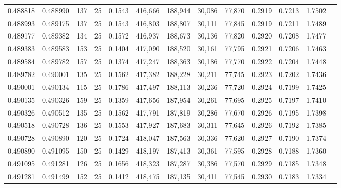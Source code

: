 \begin{tabular}{rrrrrrrrrrrrr}
0.488818 & 0.488990 &   137 &  25 &                                     0.1543 & 416,666 & 188,944 &  30,086 &  77,870 & 0.2919 & 0.7213 & 1.7502 \\
0.488993 & 0.489175 &   137 &  25 &                                     0.1543 & 416,803 & 188,807 &  30,111 &  77,845 & 0.2919 & 0.7211 & 1.7489 \\
0.489177 & 0.489382 &   134 &  25 &                                     0.1572 & 416,937 & 188,673 &  30,136 &  77,820 & 0.2920 & 0.7208 & 1.7477 \\
0.489383 & 0.489583 &   153 &  25 &                                     0.1404 & 417,090 & 188,520 &  30,161 &  77,795 & 0.2921 & 0.7206 & 1.7463 \\
0.489584 & 0.489782 &   157 &  25 &                                     0.1374 & 417,247 & 188,363 &  30,186 &  77,770 & 0.2922 & 0.7204 & 1.7448 \\
0.489782 & 0.490001 &   135 &  25 &                                     0.1562 & 417,382 & 188,228 &  30,211 &  77,745 & 0.2923 & 0.7202 & 1.7436 \\
0.490001 & 0.490134 &   115 &  25 &                                     0.1786 & 417,497 & 188,113 &  30,236 &  77,720 & 0.2924 & 0.7199 & 1.7425 \\
0.490135 & 0.490326 &   159 &  25 &                                     0.1359 & 417,656 & 187,954 &  30,261 &  77,695 & 0.2925 & 0.7197 & 1.7410 \\
0.490326 & 0.490512 &   135 &  25 &                                     0.1562 & 417,791 & 187,819 &  30,286 &  77,670 & 0.2926 & 0.7195 & 1.7398 \\
0.490518 & 0.490728 &   136 &  25 &                                     0.1553 & 417,927 & 187,683 &  30,311 &  77,645 & 0.2926 & 0.7192 & 1.7385 \\
0.490728 & 0.490890 &   120 &  25 &                                     0.1724 & 418,047 & 187,563 &  30,336 &  77,620 & 0.2927 & 0.7190 & 1.7374 \\
0.490890 & 0.491095 &   150 &  25 &                                     0.1429 & 418,197 & 187,413 &  30,361 &  77,595 & 0.2928 & 0.7188 & 1.7360 \\
0.491095 & 0.491281 &   126 &  25 &                                     0.1656 & 418,323 & 187,287 &  30,386 &  77,570 & 0.2929 & 0.7185 & 1.7348 \\
0.491281 & 0.491499 &   152 &  25 &                                     0.1412 & 418,475 & 187,135 &  30,411 &  77,545 & 0.2930 & 0.7183 & 1.7334 \\

\end{tabular}
